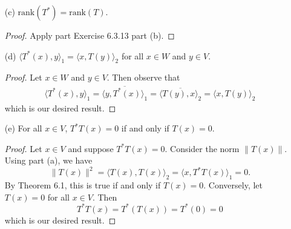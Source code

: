 \begin{enumerate}
\begin{proof}
        
        \end{proof}
    \item[(c)] \( \text{rank}(T^{*}) = \text{rank}(T) \).
        \begin{proof}
        Apply part Exercise 6.3.13 part (b).
        \end{proof}
    \item[(d)] \( {\langle T^{*}(x) , y \rangle}_{1} = \langle x , T(y) \rangle_{2} \) for all \( x \in W  \) and \( y \in V  \).
        \begin{proof}
        Let \( x \in W  \) and \( y \in V  \). Then observe that
        \begin{align*}
            \langle T^{*}(x)  , y \rangle_1 = \overline{\langle y , T^{*}(x) \rangle_1}
                                            = \overline{\langle T(y) , x \rangle_2} 
                                            = \langle x  , T(y) \rangle_2
        \end{align*}
        which is our desired result.
        \end{proof}
    \item[(e)] For all \( x \in V  \), \( T^{*}T(x) = 0  \) if and only if \( T(x) = 0  \).
        \begin{proof}
        Let \( x \in V  \) and suppose \( T^{*}T(x) = 0  \). Consider the norm \( \|T(x)\| \). Using part (a), we have   
        \[  \|T(x)\|^{2} = \langle T(x) , T(x) \rangle_2 = \langle x  , T^{*}T(x)  \rangle_1 = 0.  \]
        By Theorem 6.1, this is true if and only if \( T(x) = 0  \).
        Conversely, let \( T(x) = 0  \) for all \( x \in V  \). Then
        \[  T^{*}T(x) = T^{*}(T(x)) = T^{*}(0) = 0 \]
        which is our desired result.
    \end{proof}
\end{enumerate}

